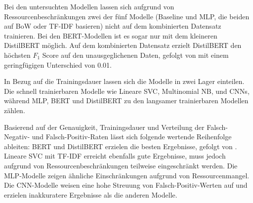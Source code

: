 Bei den untersuchten Modellen lassen sich aufgrund von Ressourcenbeschränkungen zwei der fünf Modelle (Baseline und \ac{MLP}, die beiden auf \ac{BoW} oder \ac{TF-IDF} basieren) nicht auf dem kombinierten Datensatz trainieren. Bei den BERT-Modellen ist es sogar nur mit dem kleineren DistilBERT möglich. Auf dem kombinierten Datensatz erzielt DistilBERT den höchsten \(F_1\) Score auf den unausgeglichenen Daten, gefolgt von \ft mit einem geringfügigen Unterschied von \num{0.01}.

In Bezug auf die Trainingsdauer lassen sich die Modelle in zwei Lager einteilen. Die schnell trainierbaren Modelle wie Lineare \ac{SVC}, Multinomial \ac{NB}, \ft und \acp{CNN}, während \ac{MLP}, \ac{BERT} und DistilBERT zu den langsamer trainierbaren Modellen zählen.

Basierend auf der Genauigkeit, Trainingsdauer und Verteilung der Falsch-Negativ- und Falsch-Positiv-Raten lässt sich folgende wertende Reihenfolge ableiten: \ac{BERT} und DistilBERT erzielen die besten Ergebnisse, gefolgt von \ft. Lineare \ac{SVC} mit \ac{TF-IDF} erreicht ebenfalls gute Ergebnisse, muss jedoch aufgrund von Ressourcenbeschränkungen teilweise eingeschränkt werden. Die \ac{MLP}-Modelle zeigen ähnliche Einschränkungen aufgrund von Ressourcenmangel. Die \ac{CNN}-Modelle weisen eine hohe Streuung von Falsch-Positiv-Werten auf und erzielen inakkuratere Ergebnisse als die anderen Modelle.
